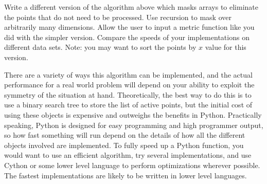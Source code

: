 \begin{problem}
Write a different version of the algorithm above which masks arrays to eliminate the points that do not need to be processed. 
Use recursion to mask over arbitrarily many dimensions. 
Allow the user to input a metric function like you did with the simpler version.
Compare the speeds of your implementations on different data sets.
Note: you may want to sort the points by $x$ value for this version.
\end{problem}

There are a variety of ways this algorithm can be implemented, and the actual performance for a real world problem will depend on your ability to exploit the symmetry of the situation at hand. 
Theoretically, the best way to do this is to use a binary search tree to store the list of active points, but the initial cost of using these objects is expensive and outweighs the benefits in Python.
Practically speaking, Python is designed for easy programming and high programmer output, so how fast something will run depend on the details of how all the different objects involved are implemented.
To fully speed up a Python function, you would want to use an efficient algorithm, try several implementations, and use Cython or some lower level language to perform optimizations wherever possible.
The fastest implementations are likely to be written in lower level languages.